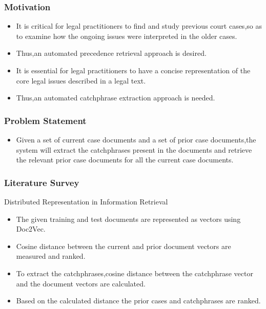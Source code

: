 \documentclass{beamer}
\begin{document}
\begin{frame}\frametitle{Motivation}
  
    \begin{itemize}
\item It is critical for legal practitioners to find and study previous court cases,so as to examine how the ongoing issues were interpreted in the older cases.
\item Thus,an automated precedence retrieval approach is desired.
\item It is essential for legal practitioners to have a concise representation of the core legal issues described in a legal text.
\item Thus,an automated catchphrase extraction approach is needed.
\end{itemize}
\end{frame}



\begin{frame}\frametitle{Problem Statement}
  
    \begin{itemize}
\item Given a set of current case documents and a set of prior case documents,the system will extract the catchphrases present in the documents and retrieve the relevant prior case documents for all the current case documents.
    \end{itemize}
\end{frame}
\begin{frame}\frametitle{Literature Survey}
    Distributed Representation in Information Retrieval\cite{reshma2017distributed}
  
    \begin{itemize}
\item The given training and test documents are represented as vectors using Doc2Vec.
\item Cosine distance between the current and prior document vectors are measured and ranked.
\item To extract the catchphrases,cosine distance between the catchphrase vector and the document vectors are calculated.
\item Based on the calculated distance the prior cases and catchphrases are ranked.        
            
    \end{itemize}
\end{frame}
\end{document}

